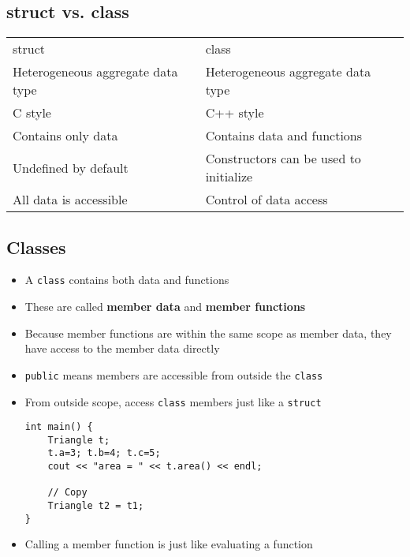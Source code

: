 \subsection{struct vs. class}
\begin{center}
\begin{tabular}{l|l}
	struct & class \\
	Heterogeneous aggregate data type & Heterogeneous aggregate data type \\
	C style & C++ style \\
	Contains only data & Contains data and functions \\
	Undefined by default & Constructors can be used to initialize \\
	All data is accessible & Control of data access \\
\end{tabular}
\end{center}

\subsection{Classes}
\begin{itemize}
\begin{lstlisting}[style=C++]
class Triangle {
	public:
	double a,b,c;//edge lengths

	double area(){ //compute area
		double s = (a+b+c)/2;
		double newArea= sqrt(s*(s-a)*(s-b)*(s-c));
		return newArea;
	}
};
\end{lstlisting}
	\item A \lstinline[style=C++]{class} contains both data and functions
	\item These are called \textbf{member data} and \textbf{member functions}
	\item Because member functions are within the same scope as member data, they have access to the member data directly
	\item \lstinline[style=C++]{public} means members are accessible from outside the \lstinline[style=C++]{class}
	\item From outside scope, access \lstinline[style=C++]{class} members just like a \lstinline[style=C++]{struct}
\begin{lstlisting}[style=C++]
int main() {
	Triangle t;
	t.a=3; t.b=4; t.c=5;
	cout << "area = " << t.area() << endl;

	// Copy
	Triangle t2 = t1;
}
\end{lstlisting}
	\item Calling a member function is just like evaluating a function
\end{itemize}

